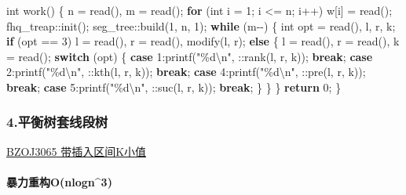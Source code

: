 \documentclass[
]{article}
\newenvironment{Shaded}{}{}
\newcommand{\ControlFlowTok}[1]{\textcolor[rgb]{0.00,0.44,0.13}{\textbf{#1}}}
\newcommand{\DataTypeTok}[1]{\textcolor[rgb]{0.56,0.13,0.00}{#1}}
\newcommand{\DecValTok}[1]{\textcolor[rgb]{0.25,0.63,0.44}{#1}}
\newcommand{\NormalTok}[1]{#1}
\newcommand{\SpecialCharTok}[1]{\textcolor[rgb]{0.25,0.44,0.63}{#1}}
\newcommand{\StringTok}[1]{\textcolor[rgb]{0.25,0.44,0.63}{#1}}
\begin{document}
\begin{Shaded}
\begin{Highlighting}[]
\DataTypeTok{int}\NormalTok{ work()}
\NormalTok{\{}
\NormalTok{    n = read(), m = read();}
    \ControlFlowTok{for}\NormalTok{ (}\DataTypeTok{int}\NormalTok{ i = }\DecValTok{1}\NormalTok{; i \textless{}= n; i++) w[i] = read();}
\NormalTok{    fhq\_treap::init();}
\NormalTok{    seg\_tree::build(}\DecValTok{1}\NormalTok{, n, }\DecValTok{1}\NormalTok{);}
    \ControlFlowTok{while}\NormalTok{ (m{-}{-})}
\NormalTok{    \{}
        \DataTypeTok{int}\NormalTok{ opt = read(), l, r, k;}
        \ControlFlowTok{if}\NormalTok{ (opt == }\DecValTok{3}\NormalTok{) l = read(), r = read(), modify(l, r);}
        \ControlFlowTok{else}
\NormalTok{        \{}
\NormalTok{            l = read(), r = read(), k = read();}
            \ControlFlowTok{switch}\NormalTok{ (opt)}
\NormalTok{            \{}
                \ControlFlowTok{case} \DecValTok{1}\NormalTok{:printf(}\StringTok{"}\SpecialCharTok{\%d\textbackslash{}n}\StringTok{"}\NormalTok{, ::rank(l, r, k)); }\ControlFlowTok{break}\NormalTok{;}
                \ControlFlowTok{case} \DecValTok{2}\NormalTok{:printf(}\StringTok{"}\SpecialCharTok{\%d\textbackslash{}n}\StringTok{"}\NormalTok{, ::kth(l, r, k)); }\ControlFlowTok{break}\NormalTok{;}
                \ControlFlowTok{case} \DecValTok{4}\NormalTok{:printf(}\StringTok{"}\SpecialCharTok{\%d\textbackslash{}n}\StringTok{"}\NormalTok{, ::pre(l, r, k)); }\ControlFlowTok{break}\NormalTok{;}
                \ControlFlowTok{case} \DecValTok{5}\NormalTok{:printf(}\StringTok{"}\SpecialCharTok{\%d\textbackslash{}n}\StringTok{"}\NormalTok{, ::suc(l, r, k)); }\ControlFlowTok{break}\NormalTok{;}
\NormalTok{            \}}
\NormalTok{        \}}
\NormalTok{    \}}
    \ControlFlowTok{return} \DecValTok{0}\NormalTok{;}
\NormalTok{\}}
\end{Highlighting}
\end{Shaded}

\hypertarget{ux5e73ux8861ux6811ux5957ux7ebfux6bb5ux6811}{%
\subsubsection{4.平衡树套线段树}\label{ux5e73ux8861ux6811ux5957ux7ebfux6bb5ux6811}}

\href{https://www.lydsy.com/JudgeOnline/problem.php?id=3065}{BZOJ3065
带插入区间K小值}

\hypertarget{ux66b4ux529bux91cdux6784onlogn3}{%
\paragraph{暴力重构O(nlogn\^{}3)}\label{ux66b4ux529bux91cdux6784onlogn3}}
\end{document}
